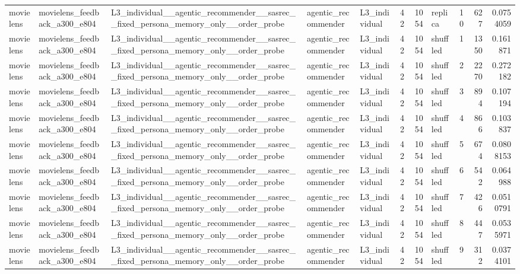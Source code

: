 \begin{table}[htbp!]
\begin{tabular}{lllllrrlrrr}
movielens & movielens\_feedback\_a300\_e804 & L3\_individual\_\_agentic\_recommender\_\_sasrec\_\_fixed\_persona\_memory\_only\_\_order\_probe & agentic\_recommender & L3\_individual & 42 & 1054 & replica & 10 & 627 & 0.0754059 \\
movielens & movielens\_feedback\_a300\_e804 & L3\_individual\_\_agentic\_recommender\_\_sasrec\_\_fixed\_persona\_memory\_only\_\_order\_probe & agentic\_recommender & L3\_individual & 42 & 1054 & shuffled & 1 & 1350 & 0.161871 \\
movielens & movielens\_feedback\_a300\_e804 & L3\_individual\_\_agentic\_recommender\_\_sasrec\_\_fixed\_persona\_memory\_only\_\_order\_probe & agentic\_recommender & L3\_individual & 42 & 1054 & shuffled & 2 & 2270 & 0.272182 \\
movielens & movielens\_feedback\_a300\_e804 & L3\_individual\_\_agentic\_recommender\_\_sasrec\_\_fixed\_persona\_memory\_only\_\_order\_probe & agentic\_recommender & L3\_individual & 42 & 1054 & shuffled & 3 & 894 & 0.107194 \\
movielens & movielens\_feedback\_a300\_e804 & L3\_individual\_\_agentic\_recommender\_\_sasrec\_\_fixed\_persona\_memory\_only\_\_order\_probe & agentic\_recommender & L3\_individual & 42 & 1054 & shuffled & 4 & 866 & 0.103837 \\
movielens & movielens\_feedback\_a300\_e804 & L3\_individual\_\_agentic\_recommender\_\_sasrec\_\_fixed\_persona\_memory\_only\_\_order\_probe & agentic\_recommender & L3\_individual & 42 & 1054 & shuffled & 5 & 674 & 0.0808153 \\
movielens & movielens\_feedback\_a300\_e804 & L3\_individual\_\_agentic\_recommender\_\_sasrec\_\_fixed\_persona\_memory\_only\_\_order\_probe & agentic\_recommender & L3\_individual & 42 & 1054 & shuffled & 6 & 542 & 0.064988 \\
movielens & movielens\_feedback\_a300\_e804 & L3\_individual\_\_agentic\_recommender\_\_sasrec\_\_fixed\_persona\_memory\_only\_\_order\_probe & agentic\_recommender & L3\_individual & 42 & 1054 & shuffled & 7 & 426 & 0.0510791 \\
movielens & movielens\_feedback\_a300\_e804 & L3\_individual\_\_agentic\_recommender\_\_sasrec\_\_fixed\_persona\_memory\_only\_\_order\_probe & agentic\_recommender & L3\_individual & 42 & 1054 & shuffled & 8 & 447 & 0.0535971 \\
movielens & movielens\_feedback\_a300\_e804 & L3\_individual\_\_agentic\_recommender\_\_sasrec\_\_fixed\_persona\_memory\_only\_\_order\_probe & agentic\_recommender & L3\_individual & 42 & 1054 & shuffled & 9 & 312 & 0.0374101 \\

\end{tabular}
\end{table}
